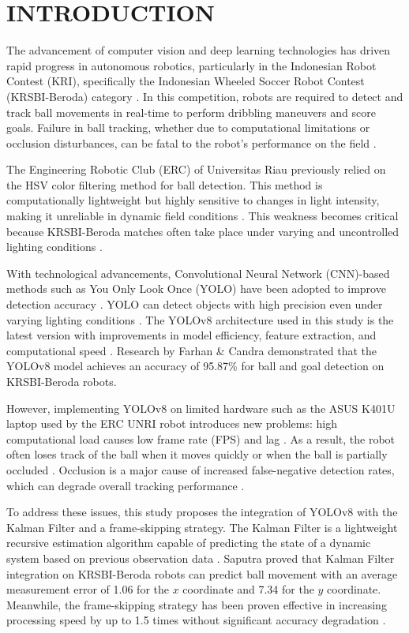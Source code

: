 \documentclass[12pt,a4paper]{article}
\begin{document}
\section{INTRODUCTION}

The advancement of computer vision and deep learning technologies has driven rapid progress in autonomous robotics, particularly in the Indonesian Robot Contest (KRI), specifically the Indonesian Wheeled Soccer Robot Contest (KRSBI-Beroda) category \cite{Kusumoputro2024}. In this competition, robots are required to detect and track ball movements in real-time to perform dribbling maneuvers and score goals. Failure in ball tracking, whether due to computational limitations or occlusion disturbances, can be fatal to the robot's performance on the field \cite{Nanda2023}.

The Engineering Robotic Club (ERC) of Universitas Riau previously relied on the HSV color filtering method for ball detection. This method is computationally lightweight but highly sensitive to changes in light intensity, making it unreliable in dynamic field conditions \cite{Nanda2023}. This weakness becomes critical because KRSBI-Beroda matches often take place under varying and uncontrolled lighting conditions \cite{Kusumoputro2024}.

With technological advancements, Convolutional Neural Network (CNN)-based methods such as You Only Look Once (YOLO) have been adopted to improve detection accuracy \cite{Farhan2025}. YOLO can detect objects with high precision even under varying lighting conditions \cite{Redmon2016}. The YOLOv8 architecture used in this study is the latest version with improvements in model efficiency, feature extraction, and computational speed \cite{Yaseen2024, Ultralytics2025}. Research by Farhan \& Candra \cite{Farhan2025} demonstrated that the YOLOv8 model achieves an accuracy of 95.87\% for ball and goal detection on KRSBI-Beroda robots.

However, implementing YOLOv8 on limited hardware such as the ASUS K401U laptop used by the ERC UNRI robot introduces new problems: high computational load causes low frame rate (FPS) and lag \cite{Surya2025}. As a result, the robot often loses track of the ball when it moves quickly or when the ball is partially occluded \cite{Ryu2021}. Occlusion is a major cause of increased false-negative detection rates, which can degrade overall tracking performance \cite{Nuralim2022}.

To address these issues, this study proposes the integration of YOLOv8 with the Kalman Filter and a frame-skipping strategy. The Kalman Filter is a lightweight recursive estimation algorithm capable of predicting the state of a dynamic system based on previous observation data \cite{Sholehurrohman2023}. Saputra \cite{Saputra2023} proved that Kalman Filter integration on KRSBI-Beroda robots can predict ball movement with an average measurement error of 1.06 for the $x$ coordinate and 7.34 for the $y$ coordinate. Meanwhile, the frame-skipping strategy has been proven effective in increasing processing speed by up to 1.5 times without significant accuracy degradation \cite{Lee2024}.
\end{document}
